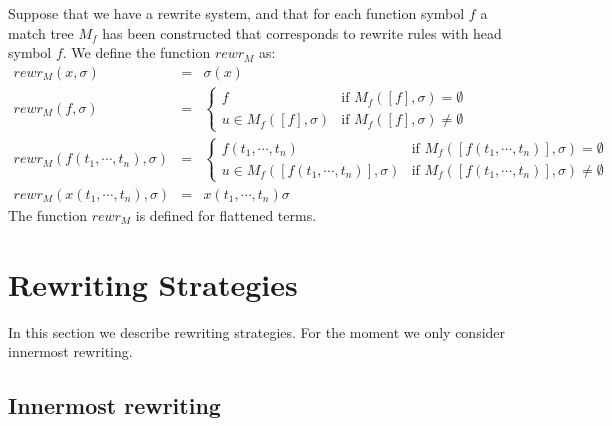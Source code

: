 \documentclass{article}
\begin{document}
Suppose that we have a rewrite system, and that for each function symbol $f$
a match tree $M_{f}$ has been constructed that corresponds to rewrite rules
with head symbol $f$. We define the function $rewr_{M}$ as:%
\begin{equation*}
\begin{array}{lll}
rewr_{M}(x,\sigma ) & = & \sigma (x) \\ 
rewr_{M}(f,\sigma ) & = & \left\{ 
\begin{array}{ll}
f & \text{if }M_{f}([f],\sigma )=\emptyset \\ 
u\in M_{f}([f],\sigma ) & \text{if }M_{f}([f],\sigma )\neq \emptyset%
\end{array}%
\right. \\ 
rewr_{M}(f(t_{1},\cdots ,t_{n}),\sigma ) & = & \left\{ 
\begin{array}{ll}
f(t_{1},\cdots ,t_{n}) & \text{if }M_{f}([f(t_{1},\cdots ,t_{n})],\sigma
)=\emptyset \\ 
u\in M_{f}([f(t_{1},\cdots ,t_{n})],\sigma ) & \text{if }M_{f}([f(t_{1},%
\cdots ,t_{n})],\sigma )\neq \emptyset%
\end{array}%
\right. \\ 
rewr_{M}(x(t_{1},\cdots ,t_{n}),\sigma ) & = & x(t_{1},\cdots ,t_{n})\sigma%
\end{array}%
\end{equation*}%
The function $rewr_{M}$ is defined for flattened terms.

\section{Rewriting Strategies}

In this section we describe rewriting strategies. For the moment we only
consider innermost rewriting.

\subsection{Innermost rewriting}
\end{document}

